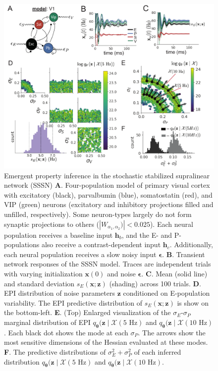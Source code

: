 \documentclass[11pt]{article}
\begin{document}
\begin{figure}
\vspace{-1cm}
\begin{center}
\includegraphics[scale=0.8]{figures/fig3/fig3.pdf}
\end{center}
\vspace{-1cm}
\caption{Emergent property inference in the stochastic stabilized supralinear network (SSSN)
\textbf{A}.  Four-population model of primary visual cortex with excitatory (black), parvalbumin (blue), somatostatin (red), and VIP (green) neurons (excitatory and inhibitory projections filled and unfilled, respectively).   
Some neuron-types largely do not form synaptic projections to others ($|W_{\alpha_1, \alpha_2})| < 0.025$).
Each neural population receives a baseline input $\mathbf{h}_b$, and the E- and P-populations also receive a contrast-dependent input $\mathbf{h}_c$.
Additionally, each neural population receives a slow noisy input $\bm{\epsilon}$.
\textbf{B}. Transient network responses of the SSSN model. Traces are independent trials with varying initialization $\mathbf{x}(0)$ and noise $\bm{\epsilon}$. 
\textbf{C}. Mean (solid line) and standard deviation $s_E(\mathbf{x}; \mathbf{z})$ (shading)  across 100 trials.
\textbf{D}. EPI distribution of noise parameters $\mathbf{z}$ conditioned on E-population variability.
The EPI predictive distribution of $s_E(\mathbf{x}; \mathbf{z})$ is show on the bottom-left.
\textbf{E}. (Top) Enlarged visualization of the $\sigma_E$-$\sigma_P$ marginal distribution of EPI $q_{\bm{\theta}}(\mathbf{z} \mid \mathcal{X}(5\text{ Hz})$ and $q_{\bm{\theta}}(\mathbf{z} \mid \mathcal{X}(10\text{ Hz})$.
Each black dot shows the mode at each $\sigma_P$.
The arrows show the most sensitive dimensions of the Hessian evaluated at these modes.
\textbf{F}. The predictive distributions of $\sigma_E^2 + \sigma_P^2$ of each inferred distribution $q_{\bm{\theta}}(\mathbf{z} \mid \mathcal{X}(5\text{ Hz})$ and $q_{\bm{\theta}}(\mathbf{z} \mid \mathcal{X}(10\text{ Hz})$.
}
 \label{fig:V1}
\end{figure}
\end{document}
